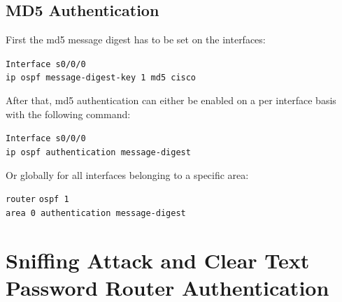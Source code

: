 \pagebreak
\section{MD5 Authentication}

First the md5 message digest has to be set on the interfaces:
\begin{tabbing}
\texttt{Interf}\= \texttt{ace s0/0/0} \\
\> \texttt{ip ospf message-digest-key 1 md5 cisco}
\end{tabbing}

After that, md5 authentication can either be enabled on a per interface basis with the following command:
\begin{tabbing}
\texttt{Interf}\= \texttt{ace s0/0/0} \\
\> \texttt{ip ospf authentication message-digest}
\end{tabbing}
   
Or globally for all interfaces belonging to a specific area:
\begin{tabbing}
\texttt{router} \= \texttt{ospf 1} \\
\> \texttt{area 0 authentication message-digest}
\end{tabbing}

\chapter{Sniffing Attack and Clear Text Password Router Authentication}